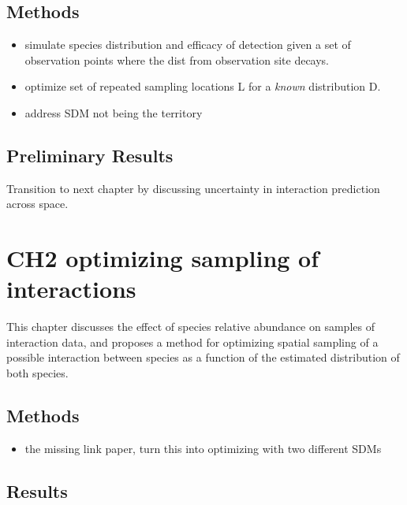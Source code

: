 \documentclass[10pt,oneside]{article}
\begin{document}
\hypertarget{methods}{%
\subsection{Methods}\label{methods}}

\begin{itemize}
\tightlist
\item
  simulate species distribution and efficacy of detection given a set of
  observation points where the dist from observation site decays.
\item
  optimize set of repeated sampling locations L for a \emph{known}
  distribution D.
\item
  address SDM not being the territory
\end{itemize}

\hypertarget{preliminary-results}{%
\subsection{Preliminary Results}\label{preliminary-results}}

Transition to next chapter by discussing uncertainty in interaction
prediction across space.

\hypertarget{ch2-optimizing-sampling-of-interactions}{%
\section{CH2 optimizing sampling of
interactions}\label{ch2-optimizing-sampling-of-interactions}}

This chapter discusses the effect of species relative abundance on
samples of interaction data, and proposes a method for optimizing
spatial sampling of a possible interaction between species as a function
of the estimated distribution of both species.

\hypertarget{methods-1}{%
\subsection{Methods}\label{methods-1}}

\begin{itemize}
\tightlist
\item
  the missing link paper, turn this into optimizing with two different
  SDMs
\end{itemize}

\hypertarget{results}{%
\subsection{Results}\label{results}}
\end{document}
